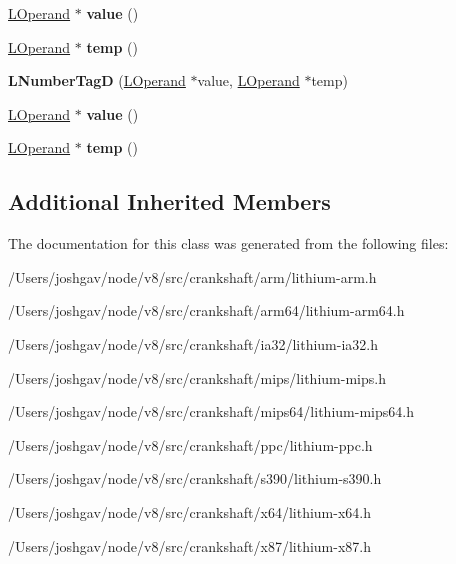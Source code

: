 \begin{DoxyCompactItemize}
\item 
\hyperlink{classv8_1_1internal_1_1_l_operand}{L\+Operand} $\ast$ {\bfseries value} ()\hypertarget{classv8_1_1internal_1_1_l_number_tag_d_a46629ef102a26f699165889f0cc36f88}{}\label{classv8_1_1internal_1_1_l_number_tag_d_a46629ef102a26f699165889f0cc36f88}

\item 
\hyperlink{classv8_1_1internal_1_1_l_operand}{L\+Operand} $\ast$ {\bfseries temp} ()\hypertarget{classv8_1_1internal_1_1_l_number_tag_d_a2163f8b3c4bd0dbeb6700e6dc18aef2c}{}\label{classv8_1_1internal_1_1_l_number_tag_d_a2163f8b3c4bd0dbeb6700e6dc18aef2c}

\item 
{\bfseries L\+Number\+TagD} (\hyperlink{classv8_1_1internal_1_1_l_operand}{L\+Operand} $\ast$value, \hyperlink{classv8_1_1internal_1_1_l_operand}{L\+Operand} $\ast$temp)\hypertarget{classv8_1_1internal_1_1_l_number_tag_d_a8bd293a2f4e86cd47dc87c4514bafae6}{}\label{classv8_1_1internal_1_1_l_number_tag_d_a8bd293a2f4e86cd47dc87c4514bafae6}

\item 
\hyperlink{classv8_1_1internal_1_1_l_operand}{L\+Operand} $\ast$ {\bfseries value} ()\hypertarget{classv8_1_1internal_1_1_l_number_tag_d_a46629ef102a26f699165889f0cc36f88}{}\label{classv8_1_1internal_1_1_l_number_tag_d_a46629ef102a26f699165889f0cc36f88}

\item 
\hyperlink{classv8_1_1internal_1_1_l_operand}{L\+Operand} $\ast$ {\bfseries temp} ()\hypertarget{classv8_1_1internal_1_1_l_number_tag_d_a2163f8b3c4bd0dbeb6700e6dc18aef2c}{}\label{classv8_1_1internal_1_1_l_number_tag_d_a2163f8b3c4bd0dbeb6700e6dc18aef2c}

\end{DoxyCompactItemize}
\subsection*{Additional Inherited Members}


The documentation for this class was generated from the following files\+:\begin{DoxyCompactItemize}
\item 
/\+Users/joshgav/node/v8/src/crankshaft/arm/lithium-\/arm.\+h\item 
/\+Users/joshgav/node/v8/src/crankshaft/arm64/lithium-\/arm64.\+h\item 
/\+Users/joshgav/node/v8/src/crankshaft/ia32/lithium-\/ia32.\+h\item 
/\+Users/joshgav/node/v8/src/crankshaft/mips/lithium-\/mips.\+h\item 
/\+Users/joshgav/node/v8/src/crankshaft/mips64/lithium-\/mips64.\+h\item 
/\+Users/joshgav/node/v8/src/crankshaft/ppc/lithium-\/ppc.\+h\item 
/\+Users/joshgav/node/v8/src/crankshaft/s390/lithium-\/s390.\+h\item 
/\+Users/joshgav/node/v8/src/crankshaft/x64/lithium-\/x64.\+h\item 
/\+Users/joshgav/node/v8/src/crankshaft/x87/lithium-\/x87.\+h\end{DoxyCompactItemize}
